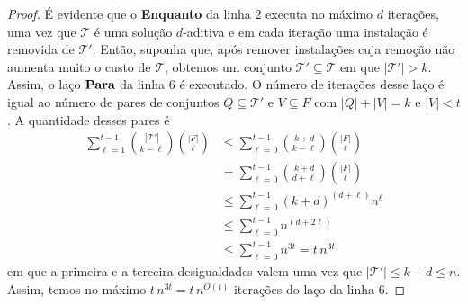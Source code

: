 \begin{proof}
    É evidente que o {\bf Enquanto} da linha 2 executa no máximo $d$ iterações, uma vez que $\mathcal{T}$ é uma solução $d$-aditiva e em cada iteração uma instalação é removida de $\mathcal{T}'$. Então, suponha que, após remover instalações cuja remoção não aumenta muito o custo de $\mathcal{T}$, obtemos um conjunto $\mathcal{T}' \subseteq \mathcal{T}$ em que $|\mathcal{T}'| > k$. Assim, o laço ${\bf Para}$ da linha 6 é executado.
    O número de iterações desse laço é igual ao número de pares de conjuntos $Q \subseteq \mathcal{T}'$ e $V \subseteq F$ com $|Q| + |V| = k$ e $|V|<t$. A quantidade desses pares é
    \begin{align}
        \sum_{\ell = 1}^{t-1}\binom{|\mathcal{T}'|}{k - \ell}\binom{|F|}{\ell} &\leq \sum_{\ell = 0}^{t-1}\binom{k+d}{k - \ell}\binom{|F|}{\ell} \nonumber \\
        &= \sum_{\ell = 0}^{t-1}\binom{k+d}{d + \ell}\binom{|F|}{\ell} \nonumber \\
        &\leq \sum_{\ell = 0}^{t-1} (k+d)^{(d+\ell)} n^{\ell}\nonumber \\
        &\leq \sum_{\ell =0}^{t-1} n^{(d + 2\ell)} \nonumber \\
        &\leq \sum_{\ell = 0}^{t-1} n^{3t} = t \,n^{3t} \nonumber
    \end{align}
    em que a primeira e a terceira desigualdades valem uma vez que $|\mathcal{T}'| \leq k + d \leq n$. Assim, temos no máximo $t \, n^{3t} = t \, n^{O(t)}$ iterações do laço da linha 6.
\end{proof}



